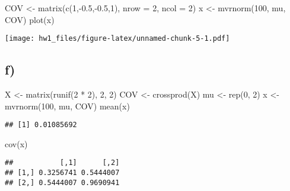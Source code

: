\documentclass[
]{article}
\newenvironment{Shaded}{\begin{snugshade}}{\end{snugshade}}
\newcommand{\AttributeTok}[1]{\textcolor[rgb]{0.77,0.63,0.00}{#1}}
\newcommand{\DecValTok}[1]{\textcolor[rgb]{0.00,0.00,0.81}{#1}}
\newcommand{\FloatTok}[1]{\textcolor[rgb]{0.00,0.00,0.81}{#1}}
\newcommand{\FunctionTok}[1]{\textcolor[rgb]{0.00,0.00,0.00}{#1}}
\newcommand{\NormalTok}[1]{#1}
\newcommand{\OtherTok}[1]{\textcolor[rgb]{0.56,0.35,0.01}{#1}}
\newcommand{\SpecialCharTok}[1]{\textcolor[rgb]{0.00,0.00,0.00}{#1}}
\begin{document}
\begin{Shaded}
\begin{Highlighting}[]
\NormalTok{COV }\OtherTok{\textless{}{-}} \FunctionTok{matrix}\NormalTok{(}\FunctionTok{c}\NormalTok{(}\DecValTok{1}\NormalTok{,}\SpecialCharTok{{-}}\FloatTok{0.5}\NormalTok{,}\SpecialCharTok{{-}}\FloatTok{0.5}\NormalTok{,}\DecValTok{1}\NormalTok{), }\AttributeTok{nrow =} \DecValTok{2}\NormalTok{, }\AttributeTok{ncol =} \DecValTok{2}\NormalTok{)}
\NormalTok{x }\OtherTok{\textless{}{-}} \FunctionTok{mvrnorm}\NormalTok{(}\DecValTok{100}\NormalTok{, mu, COV)}
\FunctionTok{plot}\NormalTok{(x)}
\end{Highlighting}
\end{Shaded}

\texttt{[image: hw1\_files/figure-latex/unnamed-chunk-5-1.pdf]}

\hypertarget{f}{%
\subsection{f)}\label{f}}

\begin{Shaded}
\begin{Highlighting}[]
\NormalTok{X }\OtherTok{\textless{}{-}} \FunctionTok{matrix}\NormalTok{(}\FunctionTok{runif}\NormalTok{(}\DecValTok{2} \SpecialCharTok{*} \DecValTok{2}\NormalTok{), }\DecValTok{2}\NormalTok{, }\DecValTok{2}\NormalTok{)}
\NormalTok{COV }\OtherTok{\textless{}{-}} \FunctionTok{crossprod}\NormalTok{(X)}
\NormalTok{mu }\OtherTok{\textless{}{-}} \FunctionTok{rep}\NormalTok{(}\DecValTok{0}\NormalTok{, }\DecValTok{2}\NormalTok{)}
\NormalTok{x }\OtherTok{\textless{}{-}} \FunctionTok{mvrnorm}\NormalTok{(}\DecValTok{100}\NormalTok{, mu, COV)}
\FunctionTok{mean}\NormalTok{(x)}
\end{Highlighting}
\end{Shaded}

\begin{verbatim}
## [1] 0.01085692
\end{verbatim}

\begin{Shaded}
\begin{Highlighting}[]
\FunctionTok{cov}\NormalTok{(x)}
\end{Highlighting}
\end{Shaded}

\begin{verbatim}
##           [,1]      [,2]
## [1,] 0.3256741 0.5444007
## [2,] 0.5444007 0.9690941
\end{verbatim}
\end{document}
